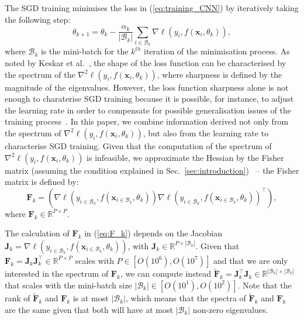 \documentclass[10pt,journal,compsoc]{IEEEtran}
\begin{document}
The SGD training minimises the loss in (\ref{eq:training_CNN}) by iteratively taking the following step:
\begin{equation}
\theta_{k+1} = \theta_{k} -   \frac{\alpha_k}{|\mathcal{B}_k|} \sum_{i \in \mathcal{B}_k} \nabla \ell(y_i,f(\mathbf{x}_i,\theta_k)),
\label{eq:sgd}
\end{equation}
where $\mathcal{B}_k$ is the mini-batch for the $k^{th}$ iteration of the minimisation process.
As noted by Keskar et al.~\cite{keskar2016large}, the shape of the loss function can be characterised by the spectrum of the $\nabla^2 \ell(y_i,f(\mathbf{x}_i,\theta_k))$, where sharpness is defined by the magnitude of the eigenvalues. %
However, the loss function sharpness alone is not enough to charaterise SGD training because it is possible, for instance, to adjust the learning rate in order to compensate for possible generalisation issues of the training process~\cite{goyal2017accurate, jastrzkebski2017three, smith2017don}.
In this paper, we combine information derived not only from the spectrum of $\nabla^2 \ell(y_i,f(\mathbf{x}_i,\theta_k))$, but also from the learning rate to characterise SGD training. %
Given that the computation of the spectrum of $\nabla^2 \ell(y_i,f(\mathbf{x}_i,\theta_k))$ is infeasible, we approximate the Hessian by the Fisher matrix (assuming the condition explained in Sec.~\ref{sec:introduction})~\cite{jastrzkebski2017three,chaudhari2016entropy,martens2014new} -- the Fisher matrix is defined by:
\begin{equation}
\mathbf{F}_k = \left ( \nabla \ell(y_{i \in \mathcal{B}_k},f(\mathbf{x}_{i \in \mathcal{B}_k},\theta_k))  \nabla \ell(y_{i \in \mathcal{B}_k},f(\mathbf{x}_{i \in \mathcal{B}_k},\theta_k))^{\top} \right ),
\label{eq:F_k}
\end{equation}
where $\mathbf{F}_k \in \mathbb R^{P \times P}$. 




The calculation of $\mathbf{F}_k$ in (\ref{eq:F_k}) depends on the Jacobian $\mathbf{J}_k = \nabla \ell(y_{i \in \mathcal{B}_k},f(\mathbf{x}_{i \in \mathcal{B}_k},\theta_k))$, with $\mathbf{J}_k  \in \mathbb R^{P \times |\mathcal{B}_k|}$.  Given that $\mathbf{F}_k = \mathbf{J}_k \mathbf{J}_k^{\top} \in \mathbb R^{P \times P}$ scales with $P \in [O(10^6),O(10^7)]$ and that we are only interested in the spectrum of $\mathbf{F}_k$, we can compute instead $\widetilde{\mathbf{F}}_k = \mathbf{J}_k^{\top} \mathbf{J}_k \in \mathbb R^{|\mathcal{B}_k| \times |\mathcal{B}_k|}$ that scales with the mini-batch size $|\mathcal{B}_k| \in [O(10^1),O(10^2)]$.  
Note that the rank of $\widetilde{\mathbf{F}}_k$ and $\mathbf{F}_k$ is at most $|\mathcal{B}_k|$, which means that the spectra of $\widetilde{\mathbf{F}}_k$ and $\mathbf{F}_k$ are the same given that both will have at most $|\mathcal{B}_k|$ non-zero eigenvalues.%
\end{document}
